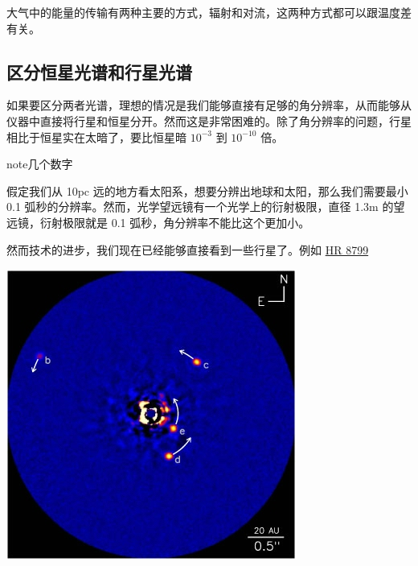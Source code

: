 \documentclass[letterpaper,10pt,english]{sphinxmanual}
\begin{document}
大气中的能量的传输有两种主要的方式，辐射和对流，这两种方式都可以跟温度差有关。


\subsection{区分恒星光谱和行星光谱}
\label{atmosphere:id6}
如果要区分两者光谱，理想的情况是我们能够直接有足够的角分辨率，从而能够从仪器中直接将行星和恒星分开。然而这是非常困难的。除了角分辨率的问题，行星相比于恒星实在太暗了，要比恒星暗 \(10^{-3}\) 到 \(10^{-10}\) 倍。

\begin{notice}{note}{几个数字}

假定我们从 10pc 远的地方看太阳系，想要分辨出地球和太阳，那么我们需要最小 0.1 弧秒的分辨率。然而，光学望远镜有一个光学上的衍射极限，直径 1.3m 的望远镜，衍射极限就是 0.1 弧秒，角分辨率不能比这个更加小。
\end{notice}

然而技术的进步，我们现在已经能够直接看到一些行星了。例如 \href{https://en.wikipedia.org/wiki/HR\_8799}{HR 8799}

{\hfill\includegraphics{Benjamin_Zuckerman_HR_8799_planets_image_Dec._2010.jpg}\hfill}
\end{document}
